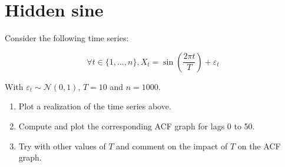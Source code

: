 \section{Hidden sine}

Consider the following time series: 

\[
    \forall t \in \lbrace 1, \ldots, n \rbrace, X_t = \sin\left(\frac{2\pi t}{T}\right) + \varepsilon_t
\]

\noindent With $\varepsilon_t \sim \mathcal{N}(0, 1)$, $T = 10$ and $n = 1000$.

\begin{enumerate}
    \item Plot a realization of the time series above.
    \item Compute and plot the corresponding ACF graph for lags 0 to 50.
    \item Try with other values of $T$ and comment on the impact of $T$ on the ACF graph.
\end{enumerate}

